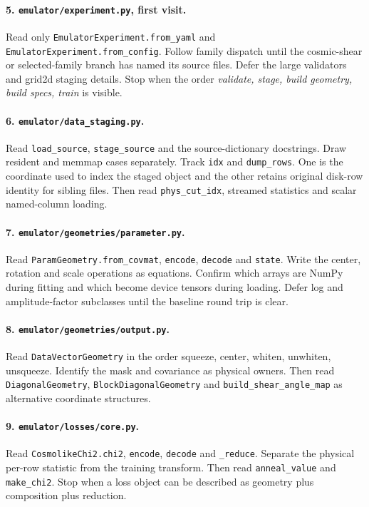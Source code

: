 \documentclass[10pt,aps,prd,twocolumn,nofootinbib]{revtex4-2}
\newcommand{\code}[1]{\texttt{#1}}
\begin{document}
\paragraph{5.  \code{emulator/experiment.py}, first visit.}
Read only \code{EmulatorExperiment.from\_yaml} and
\code{EmulatorExperiment.from\_config}.  Follow family dispatch until the
cosmic-shear or selected-family branch has named its source files.  Defer the
large validators and grid2d staging details.  Stop when the order
\emph{validate, stage, build geometry, build specs, train} is visible.

\paragraph{6.  \code{emulator/data\_staging.py}.}
Read \code{load\_source}, \code{stage\_source} and the source-dictionary
docstrings.  Draw resident and memmap cases separately.  Track \code{idx} and
\code{dump\_rows}.  One is the coordinate used to index the staged object and
the other retains original disk-row identity for sibling files.  Then read
\code{phys\_cut\_idx}, streamed statistics and scalar named-column loading.

\paragraph{7.  \code{emulator/geometries/parameter.py}.}
Read \code{ParamGeometry.from\_covmat}, \code{encode}, \code{decode} and
\code{state}.  Write the center, rotation and scale operations as equations.
Confirm which arrays are NumPy during fitting and which become device tensors
during loading.  Defer log and amplitude-factor subclasses until the baseline
round trip is clear.

\paragraph{8.  \code{emulator/geometries/output.py}.}
Read \code{DataVectorGeometry} in the order squeeze, center, whiten, unwhiten,
unsqueeze.  Identify the mask and covariance as physical owners.  Then read
\code{DiagonalGeometry}, \code{BlockDiagonalGeometry} and
\code{build\_shear\_angle\_map} as alternative coordinate structures.

\paragraph{9.  \code{emulator/losses/core.py}.}
Read \code{CosmolikeChi2.chi2}, \code{encode}, \code{decode} and
\code{\_reduce}.  Separate the physical per-row statistic from the training
transform.  Then read \code{anneal\_value} and \code{make\_chi2}.  Stop when a
loss object can be described as geometry plus composition plus reduction.
\end{document}
